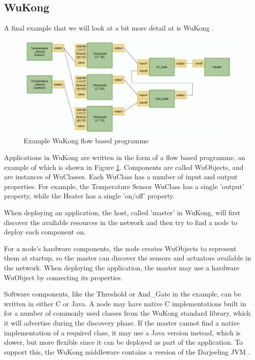 
\subsection{WuKong}
\label{sec-state-of-the-art-wukong}
A final example that we will look at a bit more detail at is WuKong \cite{Reijers:2013ut, Lin:2013dc}.


\begin{figure}[]
  \centering
  \includegraphics[width=0.8\linewidth]{wukong-fbp.png}
  \caption{Example WuKong flow based programme}
  \label{fig-wukong-fbp}
\end{figure}


Applications in WuKong are written in the form of a flow based programme, an example of which is shown in Figure \ref{fig-wukong-fbp}. Components are called WuObjects, and are instances of WuClasses. Each WuClass has a number of input and output properties. For example, the Temperature Sensor WuClass has a single 'output' property, while the Heater has a single 'on/off' property.

When deploying an application, the host, called 'master' in WuKong, will first discover the available resources in the network and then try to find a node to deploy each component on.

For a node's hardware components, the node creates WuObjects to represent them at startup, so the master can discover the sensors and actuators available in the network. When deploying the application, the master may use a hardware WuObject by connecting its properties.

Software components, like the Threshold or And\_Gate in the example, can be written in either C or Java. A node may have native C implementations built in for a number of commonly used classes from the WuKong standard library, which it will advertise during the discovery phase. If the master cannot find a native implementation of a required class, it may use a Java version instead, which is slower, but more flexible since it can be deployed as part of the application. To support this, the WuKong middleware contains a version of the Darjeeling JVM \cite{Brouwers:2009cj}.

